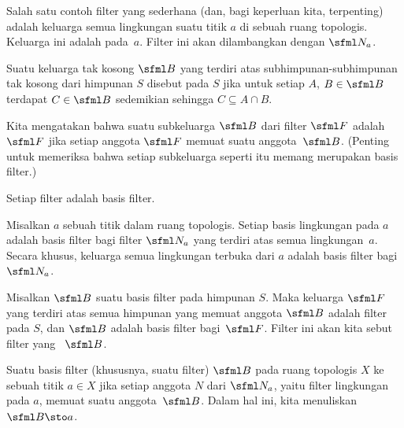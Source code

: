 \begin{exam} Salah satu contoh filter yang sederhana (dan, bagi keperluan kita, terpenting) adalah keluarga semua lingkungan suatu titik $a$ di sebuah
ruang topologis.  Keluarga ini adalah
 pada~$a$. Filter ini akan
dilambangkan dengan $\sfml N_a$.
\end{exam}

\begin{defn} Suatu keluarga tak kosong $\sfml B$ yang terdiri atas subhimpunan-subhimpunan tak kosong dari himpunan $S$ disebut
 pada $S$ jika untuk setiap $A$, $B \in \sfml B$ terdapat $C \in \sfml B$ sedemikian sehingga $C \subseteq A \cap B$.

Kita mengatakan bahwa suatu subkeluarga $\sfml B$ dari filter $\sfml F$ adalah
 $\sfml F$ jika setiap anggota $\sfml F$ memuat suatu anggota~$\sfml B$.  (Penting untuk memeriksa bahwa
setiap subkeluarga seperti itu memang merupakan basis filter.)
\end{defn}

\begin{exam} Setiap filter adalah basis filter.
\end{exam}

\begin{exam} Misalkan $a$ sebuah titik dalam ruang topologis.  Setiap basis lingkungan pada $a$ adalah basis filter bagi filter $\sfml N_a$
yang terdiri atas semua lingkungan~$a$. Secara khusus, keluarga semua lingkungan terbuka dari $a$ adalah basis filter bagi~$\sfml N_a$.
\end{exam}

\begin{exam} Misalkan $\sfml B$ suatu basis filter pada himpunan $S$. Maka keluarga $\sfml F$ yang terdiri atas semua himpunan yang memuat anggota $\sfml B$
adalah filter pada $S$, dan $\sfml B$ adalah basis filter bagi~$\sfml F$.  Filter ini akan kita sebut filter yang
~$\sfml B$.
\end{exam}

\begin{defn} Suatu basis filter (khususnya, suatu filter) $\sfml B$ pada ruang topologis $X$
 ke sebuah titik $a \in X$ jika setiap anggota $N$ dari $\sfml N_a$, yaitu filter lingkungan pada $a$, memuat suatu anggota~$\sfml B$.
Dalam hal ini, kita
menuliskan $\sfml B \sto a$.
\end{defn}

